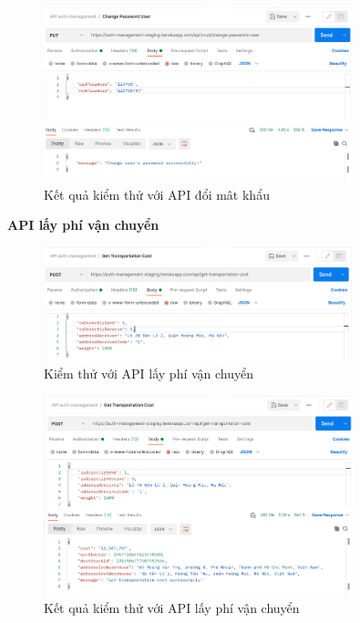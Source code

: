 		\begin{figure}[!ht]
			\includegraphics[width=0.8\textwidth]{Images/testing/API-change-password-result.png}
			\centering
			\linebreak
			\caption{Kết quả kiểm thử với API đổi mât khẩu}
		\end{figure}
		
		\newpage
		
		\textbf{API lấy phí vận chuyển}
		
		\begin{figure}[!ht]
			\includegraphics[width=0.8\textwidth]{Images/testing/API-get-cost.png}
			\centering
			\linebreak
			\caption{Kiểm thử với API lấy phí vận chuyển}
		\end{figure}
		
		\begin{figure}[!ht]
			\includegraphics[width=0.8\textwidth]{Images/testing/API-get-cost-result.png}
			\centering
			\linebreak
			\caption{Kết quả kiểm thử với API lấy phí vận chuyển}
		\end{figure}
		
